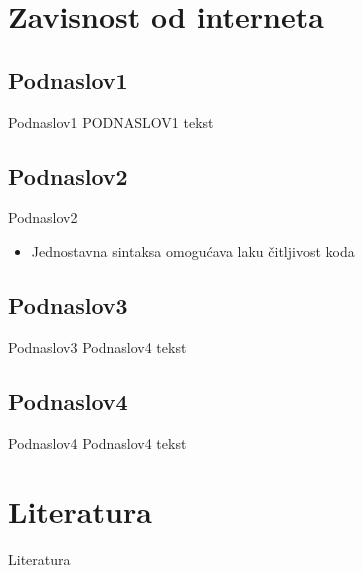 \documentclass{beamer}
\begin{document}
\section{Zavisnost od interneta}
	\subsection*{Podnaslov1}
	\begin{frame}{Podnaslov1}
			PODNASLOV1 tekst
	\end{frame}

	\subsection*{Podnaslov2}
		\begin{frame}{Podnaslov2}
			\begin{itemize}
			\item Jednostavna sintaksa omogućava laku čitljivost koda
			\end{itemize}
		\end{frame}
	\subsection*{Podnaslov3}
	\begin{frame}{Podnaslov3}
		Podnaslov4 tekst
	\end{frame}
	
	\subsection*{Podnaslov4}
	\begin{frame}{Podnaslov4}
		Podnaslov4 tekst
	\end{frame}
	

\section{Literatura}

\begin{frame}{Literatura}



\end{frame}
\end{document}
